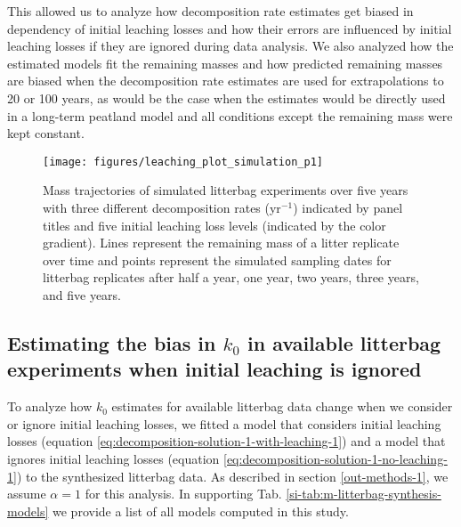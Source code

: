 \documentclass[bg, manuscript]{copernicus}
\begin{document}
This allowed us to analyze how decomposition rate estimates get biased in dependency of initial leaching losses and how their errors are influenced by initial leaching losses if they are ignored during data analysis. We also analyzed how the estimated models fit the remaining masses and how predicted remaining masses are biased when the decomposition rate estimates are used for extrapolations to 20 or 100 years, as would be the case when the estimates would be directly used in a long-term peatland model and all conditions except the remaining mass were kept constant.



\begin{figure}[H]

{\centering \texttt{[image: figures/leaching\_plot\_simulation\_p1]} 

}

\caption{Mass trajectories of simulated litterbag experiments over five years with three different decomposition rates (yr\(^{-1}\)) indicated by panel titles and five initial leaching loss levels (indicated by the color gradient). Lines represent the remaining mass of a litter replicate over time and points represent the simulated sampling dates for litterbag replicates after half a year, one year, two years, three years, and five years.}\label{fig:out-simulation-p1}
\end{figure}

\hypertarget{methods-bias-real-1}{%
\subsection{\texorpdfstring{Estimating the bias in \(k_0\) in available litterbag experiments when initial leaching is ignored}{Estimating the bias in k\_0 in available litterbag experiments when initial leaching is ignored}}\label{methods-bias-real-1}}

To analyze how \(k_0\) estimates for available litterbag data change when we consider or ignore initial leaching losses, we fitted a model that considers initial leaching losses (equation \eqref{eq:decomposition-solution-1-with-leaching-1}) and a model that ignores initial leaching losses (equation \eqref{eq:decomposition-solution-1-no-leaching-1}) to the synthesized litterbag data. As described in section \ref{out-methods-1}, we assume \(\alpha=1\) for this analysis. In supporting Tab. \ref{si-tab:m-litterbag-synthesis-models} we provide a list of all models computed in this study.
\end{document}
